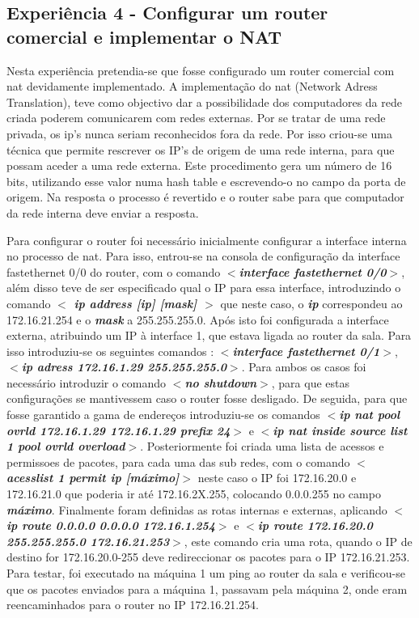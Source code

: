 \documentclass[a4paper]{article}
\begin{document}
\subsection{Experiência 4 - Configurar um router comercial e implementar o NAT}
Nesta experiência pretendia-se que fosse configurado um router comercial com nat devidamente implementado. A implementação do nat (Network Adress Translation), teve como objectivo dar a possibilidade dos computadores da rede criada poderem comunicarem com redes externas. Por se tratar de uma rede privada, os ip’s nunca seriam reconhecidos fora da rede. Por isso criou-se uma técnica que permite rescrever os IP’s de origem  de uma rede interna, para que possam aceder a uma rede externa. Este procedimento gera um número de 16 bits, utilizando esse valor numa hash table e escrevendo-o no campo da porta de origem. Na resposta o processo é revertido e o router sabe para que computador da rede interna deve enviar a resposta.

Para configurar o router foi necessário inicialmente configurar a interface interna no processo de nat. Para isso, entrou-se na consola de configuração da interface fastethernet 0/0 do router, com o comando \textbf{\textit{$<$interface fastethernet 0/0$>$}}, além disso teve de ser especificado qual o IP para essa interface, introduzindo o comando\textbf{ \textit{$<$ ip address [ip] [mask] $>$}} que neste caso, o \textbf{\textit{ip}} correspondeu ao 172.16.21.254 e o \textbf{\textit{mask}} a 255.255.255.0.  Após isto foi configurada a interface externa, atribuindo um IP à interface 1, que estava ligada ao router da sala. Para isso introduziu-se os seguintes comandos : \textbf{\textit{$<$interface fastethernet 0/1$>$}}, \textbf{\textit{$<$ip adress 172.16.1.29 255.255.255.0$>$}}. Para ambos os casos foi necessário introduzir o comando \textbf{\textit{$<$no shutdown$>$}}, para que estas configurações se mantivessem caso o router fosse desligado. De seguida, para que fosse garantido a gama de endereços introduziu-se os comandos \textbf{\textit{$<$ip nat pool ovrld 172.16.1.29 172.16.1.29 prefix 24$>$}} e \textbf{\textit{$<$ip nat inside source list 1 pool ovrld overload$>$}}. Posteriormente foi criada uma lista de acessos e permissoes de pacotes, para cada uma das sub redes, com o comando \textbf{\textit{$<$acesslist 1 permit ip [máximo]$>$}} neste caso o IP foi 172.16.20.0 e 172.16.21.0 que poderia ir até 172.16.2X.255, colocando 0.0.0.255 no campo \textbf{\textit{máximo}}.
Finalmente foram definidas as rotas internas e externas, aplicando \textbf{\textit{$<$ip route 0.0.0.0
0.0.0.0 172.16.1.254$>$}} e \textbf{\textit{$<$ip route 172.16.20.0 255.255.255.0 172.16.21.253$>$}}, este comando cria uma rota, quando o IP de destino for 172.16.20.0-255 deve redireccionar os pacotes para o IP 172.16.21.253.
Para testar, foi executado na máquina 1 um ping ao router da sala e verificou-se que os pacotes enviados para a máquina 1, passavam pela máquina 2, onde eram reencaminhados para o router no IP 172.16.21.254.
\end{document}
